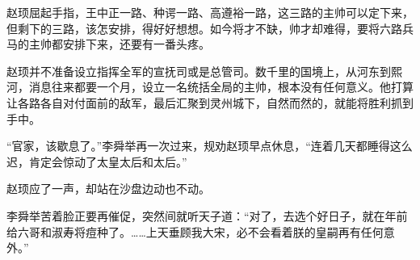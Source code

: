 赵顼屈起手指，王中正一路、种谔一路、高遵裕一路，这三路的主帅可以定下来，但剩下的三路，该怎安排，得好好想想。如今将才不缺，帅才却难得，要将六路兵马的主帅都安排下来，还要有一番头疼。

赵顼并不准备设立指挥全军的宣抚司或是总管司。数千里的国境上，从河东到熙河，消息往来都要一个月，设立一名统括全局的主帅，根本没有任何意义。他打算让各路各自对付面前的敌军，最后汇聚到灵州城下，自然而然的，就能将胜利抓到手中。

“官家，该歇息了。”李舜举再一次过来，规劝赵顼早点休息，“连着几天都睡得这么迟，肯定会惊动了太皇太后和太后。”

赵顼应了一声，却站在沙盘边动也不动。

李舜举苦着脸正要再催促，突然间就听天子道：“对了，去选个好日子，就在年前给六哥和淑寿将痘种了。……上天垂顾我大宋，必不会看着朕的皇嗣再有任何意外。”

